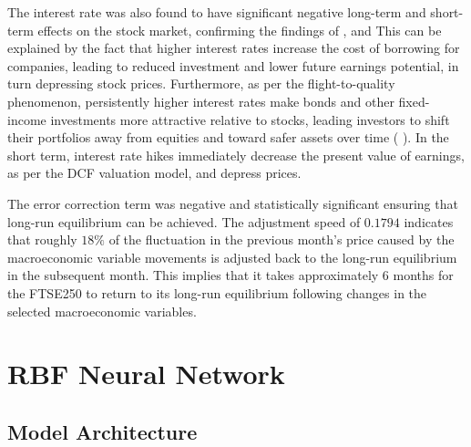 \documentclass[11pt,a4paper]{article}
\newcommand{\citeboth}[1]{\citeauthor{#1} \citep{#1}}
\begin{document}
The interest rate was also found to have significant negative long-term and short-term effects on the stock market, confirming the findings of \citeboth{alam2009}, \citeboth{demir2019} and \citeboth{neifar2023}
This can be explained by the fact that higher interest 
rates increase the cost of borrowing for companies, leading to reduced investment 
and lower future earnings potential, in turn depressing stock prices. 
Furthermore, as per the flight-to-quality phenomenon, persistently higher interest rates make bonds and other fixed-income 
investments more attractive relative to stocks, leading investors to shift 
their portfolios away from equities and toward safer assets over time (\citeboth{asgharian2016}). 
In the short term, interest rate hikes immediately decrease the present value of earnings, as per the 
DCF valuation model, and depress prices.

The error correction term 
was negative and statistically significant ensuring that long-run equilibrium 
can be achieved. The adjustment speed of $0.1794$ indicates that 
roughly $18\%$ of the fluctuation in the previous month's price caused by the 
macroeconomic variable movements is adjusted back to the long-run equilibrium in the subsequent month. This implies 
that it takes approximately 6 months for the FTSE250 to return to its long-run equilibrium following 
changes in the selected macroeconomic variables.


\section{RBF Neural Network}

\subsection{Model Architecture}
\end{document}
